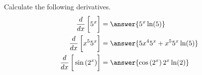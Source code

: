 \documentclass{ximera}
\author{Nela Lakos \and Kyle Parsons}
\begin{document}
\begin{exercise}

Calculate the following derivatives.
\begin{align*}
\ddx\left[\vphantom{\ddx}5^x\right] &= \answer{5^x\ln(5)}\\
\ddx\left[\vphantom{\ddx}x^{5}5^x\right] &= \answer{5x^4 5^x + x^5 5^x\ln(5)}\\
\ddx\left[\vphantom{\ddx}\sin\left(2^x\right)\right]  &= \answer{\cos\left(2^{x}\right)2^{x}\ln(2)}
\end{align*}

\end{exercise}
\end{document}
